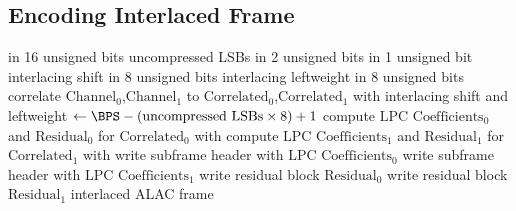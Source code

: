 \clearpage

\subsection{Encoding Interlaced Frame}
{
 in 16 unsigned bits
\WRITE uncompressed LSBs in 2 unsigned bits\;
 in 1 unsigned bit
\WRITE interlacing shift in 8 unsigned bits\;
\WRITE interlacing leftweight in 8 unsigned bits\;
correlate $\text{Channel}_0$,$\text{Channel}_1$ to $\text{Correlated}_0$,$\text{Correlated}_1$ with interlacing shift and leftweight\;
\SAMPLESIZE $\leftarrow \text{\BPS} - (\text{uncompressed LSBs} \times 8) + 1$\;
compute $\text{LPC Coefficients}_0$ and $\text{Residual}_0$ for $\text{Correlated}_0$ with \SAMPLESIZE\;
compute $\text{LPC Coefficients}_1$ and $\text{Residual}_1$ for $\text{Correlated}_1$ with \SAMPLESIZE\;
write subframe header with $\text{LPC Coefficients}_0$\;
write subframe header with $\text{LPC Coefficients}_1$\;
write residual block $\text{Residual}_0$\;
write residual block $\text{Residual}_1$\;
\Return interlaced ALAC frame\;
\EALGORITHM
}

